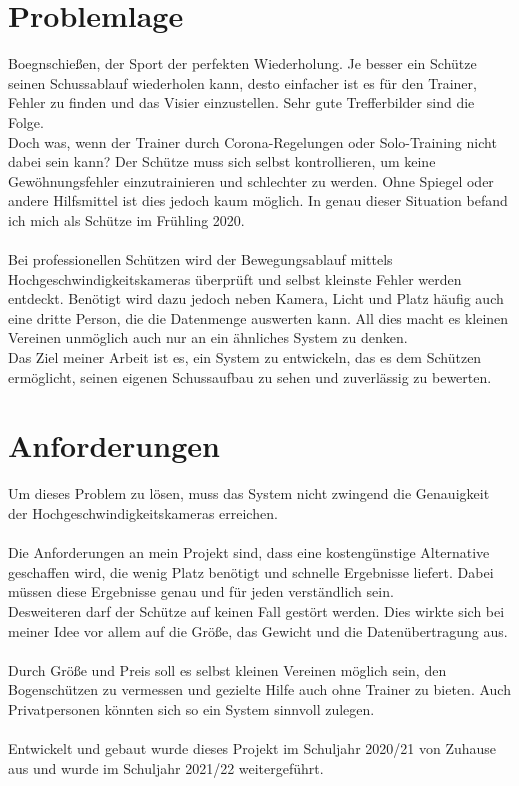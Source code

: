 \section{Problemlage}
Boegnschießen, der Sport der perfekten Wiederholung. Je besser ein Schütze seinen Schussablauf wiederholen kann, 
desto einfacher ist es für den Trainer, Fehler zu finden und das Visier einzustellen. Sehr gute Trefferbilder sind 
die Folge.\\
Doch was, wenn der Trainer durch Corona-Regelungen oder Solo-Training nicht dabei sein kann? Der Schütze muss sich
selbst kontrollieren, um keine Gewöhnungsfehler einzutrainieren und schlechter zu werden. Ohne Spiegel oder andere 
Hilfsmittel ist dies jedoch kaum möglich. In genau dieser Situation befand ich mich als Schütze im Frühling 2020.\\ 
\\
Bei professionellen Schützen wird der Bewegungsablauf mittels Hochgeschwindigkeitskameras überprüft und selbst kleinste
Fehler werden entdeckt. Benötigt wird dazu jedoch neben Kamera, Licht und Platz häufig auch eine dritte Person, die die
Datenmenge auswerten kann. All dies macht es kleinen Vereinen unmöglich auch nur an ein ähnliches System zu denken.\\
Das Ziel meiner Arbeit ist es, ein System zu entwickeln, das es dem Schützen ermöglicht, seinen eigenen Schussaufbau 
zu sehen und zuverlässig zu bewerten. 

\section{Anforderungen}
Um dieses Problem zu lösen, muss das System nicht zwingend die Genauigkeit der Hochgeschwindigkeitskameras erreichen. \\
\\
Die Anforderungen an mein Projekt sind, dass eine kostengünstige Alternative 
geschaffen wird, die wenig Platz benötigt und schnelle Ergebnisse liefert. Dabei müssen diese 
Ergebnisse genau und für jeden verständlich sein.\\
Desweiteren darf der Schütze auf keinen Fall gestört werden.
Dies wirkte sich bei meiner Idee vor allem auf die Größe, das Gewicht und die 
Datenübertragung aus.\\
\\
Durch Größe und Preis soll es selbst kleinen Vereinen möglich sein, den Bogenschützen zu vermessen und gezielte Hilfe
auch ohne Trainer zu bieten. Auch Privatpersonen könnten sich so ein System sinnvoll zulegen.\\
\\
Entwickelt und gebaut wurde dieses Projekt im Schuljahr 2020/21 von Zuhause aus und wurde 
im Schuljahr 2021/22 weitergeführt.

